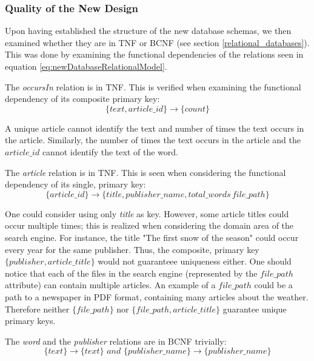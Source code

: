 \subsubsection*{Quality of the New Design}
Upon having established the structure of the new database schemas, we then examined whether they are in TNF or BCNF (see section \ref{relational_databases}).
This was done by examining the functional dependencies of the relations seen in equation \ref{eq:newDatabaseRelationalModel}.

The \textit{occursIn} relation is in TNF. 
This is verified when examining the functional dependency of its composite primary key:
\begin{equation*}
 \{text,article\_id\}\rightarrow \{count\}   
\end{equation*}

A unique article cannot identify the text and number of times the text occurs in the article.
Similarly, the number of times the text occurs in the article and the $article\_id$ cannot identify the text of the word.

The \textit{article} relation is in TNF. 
This is seen when considering the functional dependency of its single, primary key:
\begin{equation*}
    \{article\_id\} \rightarrow \{title, publisher\_name,total\_words\, file\_path\}
\end{equation*}

One could consider using only \textit{title} as key. 
However, some article titles could occur multiple times; this is realized when considering the domain area of the \knox{} search engine.
For instance, the title "The first snow of the season" could occur every year for the same publisher.
Thus, the composite, primary key $\{ publisher,article\_title \}$ would not guaranteee uniqueness either.
One should notice that each of the files in the search engine (represented by the $file\_path$ attribute) can contain multiple articles.
An example of a $file\_path$ could be a path to a newspaper in PDF format, containing many articles about the weather.
Therefore neither $\{file\_path\}$ nor $\{ file\_path, article\_title \}$ guarantee unique primary keys.


The \textit{word} and the \textit{publisher} relations are in BCNF trivially:
\begin{equation*}
    \{ text\} \rightarrow \{text\} \textit{\ and\ } \{ publisher\_name \} \rightarrow \{ publisher\_name\}
\end{equation*}
